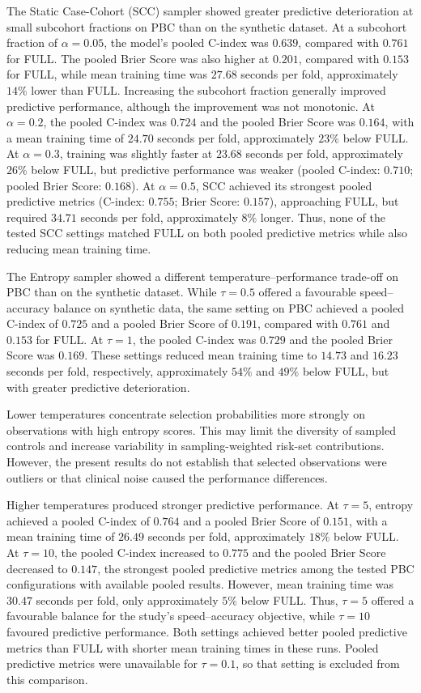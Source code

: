 \documentclass[a4paper,twoside,12pt]{report}
\begin{document}
The Static Case-Cohort (SCC) sampler showed greater predictive deterioration at small subcohort fractions on PBC than on the synthetic dataset. At a subcohort fraction of $\alpha=0.05$, the model's pooled C-index was $0.639$, compared with $0.761$ for FULL. The pooled Brier Score was also higher at $0.201$, compared with $0.153$ for FULL, while mean training time was $27.68$ seconds per fold, approximately $14\%$ lower than FULL. Increasing the subcohort fraction generally improved predictive performance, although the improvement was not monotonic. At $\alpha=0.2$, the pooled C-index was $0.724$ and the pooled Brier Score was $0.164$, with a mean training time of $24.70$ seconds per fold, approximately $23\%$ below FULL. At $\alpha=0.3$, training was slightly faster at $23.68$ seconds per fold, approximately $26\%$ below FULL, but predictive performance was weaker (pooled C-index: $0.710$; pooled Brier Score: $0.168$). At $\alpha=0.5$, SCC achieved its strongest pooled predictive metrics (C-index: $0.755$; Brier Score: $0.157$), approaching FULL, but required $34.71$ seconds per fold, approximately $8\%$ longer. Thus, none of the tested SCC settings matched FULL on both pooled predictive metrics while also reducing mean training time.

The Entropy sampler showed a different temperature--performance trade-off on PBC than on the synthetic dataset. While $\tau=0.5$ offered a favourable speed--accuracy balance on synthetic data, the same setting on PBC achieved a pooled C-index of $0.725$ and a pooled Brier Score of $0.191$, compared with $0.761$ and $0.153$ for FULL. At $\tau=1$, the pooled C-index was $0.729$ and the pooled Brier Score was $0.169$. These settings reduced mean training time to $14.73$ and $16.23$ seconds per fold, respectively, approximately $54\%$ and $49\%$ below FULL, but with greater predictive deterioration.

Lower temperatures concentrate selection probabilities more strongly on observations with high entropy scores. This may limit the diversity of sampled controls and increase variability in sampling-weighted risk-set contributions. However, the present results do not establish that selected observations were outliers or that clinical noise caused the performance differences.

Higher temperatures produced stronger predictive performance. At $\tau=5$, entropy achieved a pooled C-index of $0.764$ and a pooled Brier Score of $0.151$, with a mean training time of $26.49$ seconds per fold, approximately $18\%$ below FULL. At $\tau=10$, the pooled C-index increased to $0.775$ and the pooled Brier Score decreased to $0.147$, the strongest pooled predictive metrics among the tested PBC configurations with available pooled results. However, mean training time was $30.47$ seconds per fold, only approximately $5\%$ below FULL. Thus, $\tau=5$ offered a favourable balance for the study's speed--accuracy objective, while $\tau=10$ favoured predictive performance. Both settings achieved better pooled predictive metrics than FULL with shorter mean training times in these runs. Pooled predictive metrics were unavailable for $\tau=0.1$, so that setting is excluded from this comparison.
\end{document}
